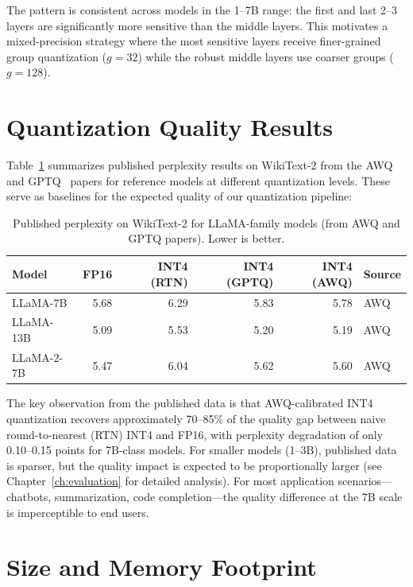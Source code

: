 \documentclass[12pt, letterpaper, twoside]{report}
\begin{document}
The pattern is consistent across models in the 1--7B range: the first and last 2--3 layers are significantly more sensitive than the middle layers. This motivates a mixed-precision strategy where the most sensitive layers receive finer-grained group quantization ($g = 32$) while the robust middle layers use coarser groups ($g = 128$).

\section{Quantization Quality Results}
\label{sec:quant_results}

Table~\ref{tab:quant_results} summarizes published perplexity results on WikiText-2 from the AWQ~\citep{lin2024awq} and GPTQ~\citep{frantar2022gptq} papers for reference models at different quantization levels. These serve as baselines for the expected quality of our quantization pipeline:

\begin{table}[H]
\centering
\caption{Published perplexity on WikiText-2 for LLaMA-family models (from AWQ and GPTQ papers). Lower is better.}
\label{tab:quant_results}
\begin{tabular}{@{}lrrrrl@{}}
\toprule
\textbf{Model} & \textbf{FP16} & \textbf{INT4 (RTN)} & \textbf{INT4 (GPTQ)} & \textbf{INT4 (AWQ)} & \textbf{Source} \\
\midrule
LLaMA-7B  & 5.68 & 6.29 & 5.83 & 5.78 & AWQ~\citep{lin2024awq} \\
LLaMA-13B & 5.09 & 5.53 & 5.20 & 5.19 & AWQ~\citep{lin2024awq} \\
LLaMA-2-7B & 5.47 & 6.04 & 5.62 & 5.60 & AWQ~\citep{lin2024awq} \\
\bottomrule
\end{tabular}
\end{table}

The key observation from the published data is that AWQ-calibrated INT4 quantization recovers approximately 70--85\% of the quality gap between naive round-to-nearest (RTN) INT4 and FP16, with perplexity degradation of only 0.10--0.15 points for 7B-class models. For smaller models (1--3B), published data is sparser, but the quality impact is expected to be proportionally larger (see Chapter~\ref{ch:evaluation} for detailed analysis). For most application scenarios---chatbots, summarization, code completion---the quality difference at the 7B scale is imperceptible to end users.

\section{Size and Memory Footprint}
\label{sec:size_footprint}
\end{document}
